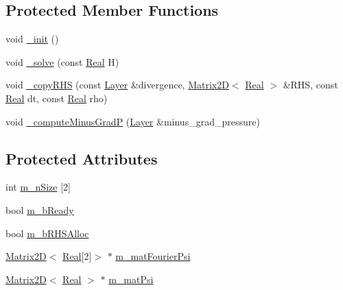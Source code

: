 \subsection*{Protected Member Functions}
\begin{DoxyCompactItemize}
\item 
void \hyperlink{class_pressure_solver___f_f_t_w_a009887d2dd55f2fa8bfa051d0fc8a2ed}{\+\_\+init} ()
\item 
void \hyperlink{class_pressure_solver___f_f_t_w_a032ca9b43334ac12d0d8c0458ba72552}{\+\_\+solve} (const \hyperlink{_h_d_f5_dumper_8h_a445a5f0e2a34c9d97d69a3c2d1957907}{Real} H)
\item 
void \hyperlink{class_pressure_solver___f_f_t_w_acdc7db3a11b1f99c30258dab37b6e5f1}{\+\_\+copy\+R\+H\+S} (const \hyperlink{struct_layer}{Layer} \&divergence, \hyperlink{class_matrix2_d}{Matrix2\+D}$<$ \hyperlink{_h_d_f5_dumper_8h_a445a5f0e2a34c9d97d69a3c2d1957907}{Real} $>$ \&R\+H\+S, const \hyperlink{_h_d_f5_dumper_8h_a445a5f0e2a34c9d97d69a3c2d1957907}{Real} dt, const \hyperlink{_h_d_f5_dumper_8h_a445a5f0e2a34c9d97d69a3c2d1957907}{Real} rho)
\item 
void \hyperlink{class_pressure_solver___f_f_t_w_aa87807f7855704655feb6d7ed13ae922}{\+\_\+compute\+Minus\+Grad\+P} (\hyperlink{struct_layer}{Layer} \&minus\+\_\+grad\+\_\+pressure)
\end{DoxyCompactItemize}
\subsection*{Protected Attributes}
\begin{DoxyCompactItemize}
\item 
int \hyperlink{class_pressure_solver___f_f_t_w_ab8e6476a6cfeff321785f4cb0220aa08}{m\+\_\+n\+Size} \mbox{[}2\mbox{]}
\item 
bool \hyperlink{class_pressure_solver___f_f_t_w_a9a9fc4281a4c7cceab63ebf005ff542d}{m\+\_\+b\+Ready}
\item 
bool \hyperlink{class_pressure_solver___f_f_t_w_aa2f254d6902f20fcb0af49b95cbd6d78}{m\+\_\+b\+R\+H\+S\+Alloc}
\item 
\hyperlink{class_matrix2_d}{Matrix2\+D}$<$ \hyperlink{_h_d_f5_dumper_8h_a445a5f0e2a34c9d97d69a3c2d1957907}{Real}\mbox{[}2\mbox{]}$>$ $\ast$ \hyperlink{class_pressure_solver___f_f_t_w_a3f07db40ecf491e6ba5513e40c455310}{m\+\_\+mat\+Fourier\+Psi}
\item 
\hyperlink{class_matrix2_d}{Matrix2\+D}$<$ \hyperlink{_h_d_f5_dumper_8h_a445a5f0e2a34c9d97d69a3c2d1957907}{Real} $>$ $\ast$ \hyperlink{class_pressure_solver___f_f_t_w_aa35e05549aae89c34c0de9b183041905}{m\+\_\+mat\+Psi}
\end{DoxyCompactItemize}


